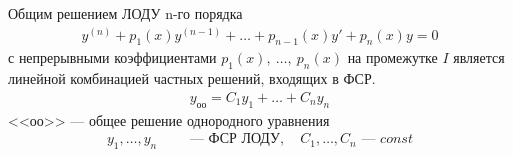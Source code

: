 \begin{theorem*}
    Общим решением ЛОДУ n-го порядка
    \begin{gather}
        y^{(n)} + p_1(x)y^{(n-1)} + \ldots + p_{n-1}(x) y' + p_n(x) y = 0
    \end{gather}
    с непрерывными коэффициентами $p_1(x),\ \ldots,\ p_n(x)$ на промежутке $I$ является линейной комбинацией частных решений, входящих в ФСР.
    \begin{align}
        y_{\text{оо}} = C_1y_1 + \ldots + C_ny_n \tag{5}
    \end{align}
    <<оо>> --- общее решение однородного уравнения
    \begin{align}
        y_1, \ldots, y_n\qquad \text{ --- ФСР ЛОДУ},\quad C_1, \ldots, C_n \text{ --- } const
    \end{align}
\end{theorem*}
